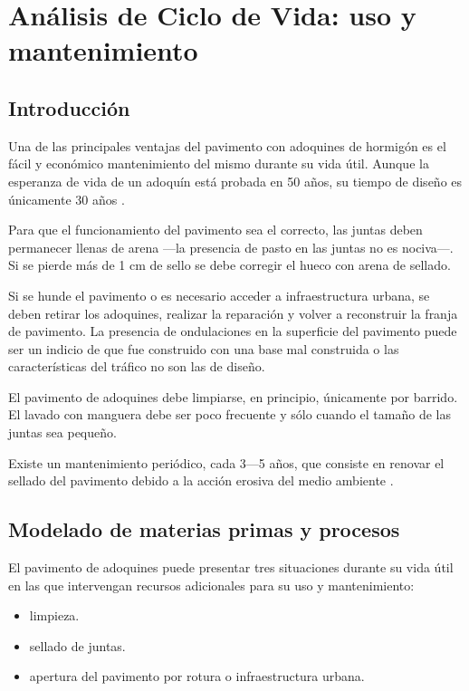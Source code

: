 \chapter{Análisis de Ciclo de Vida: uso y mantenimiento}

\section{Introducción}\label{sec:introduccionuso}

Una de las principales ventajas del pavimento con adoquines de hormigón es el fácil y económico mantenimiento del mismo durante su vida útil. Aunque la esperanza de vida de un adoquín está probada en 50 años, su tiempo de diseño es únicamente 30 años \cite{euroadoquin}.

Para que el funcionamiento del pavimento sea el correcto, las juntas deben permanecer llenas de arena —la presencia de pasto en las juntas no es nociva—. Si se pierde más de 1 \si{cm} de sello se debe corregir el hueco con arena de sellado.

Si se hunde el pavimento o es necesario acceder a infraestructura urbana, se deben retirar los adoquines, realizar la reparación y volver a reconstruir la franja de pavimento. La presencia de ondulaciones en la superficie del pavimento puede ser un indicio de que fue construido con una base mal construida o las características del tráfico no son las de diseño.

El pavimento de adoquines debe limpiarse, en principio, únicamente por barrido. El lavado con manguera debe ser poco frecuente y sólo cuando el tamaño de las juntas sea pequeño.

Existe un mantenimiento periódico, cada 3—5 años, que consiste en renovar el sellado del pavimento debido a la acción erosiva del medio ambiente \cite{malaka}.


\section{Modelado de materias primas y procesos}\label{sec:modeladoprocesosusoymantenimiento}

El pavimento de adoquines puede presentar tres situaciones durante su vida útil en las que intervengan recursos adicionales para su uso y mantenimiento:
\begin{itemize}
\item limpieza.
\item sellado de juntas.
\item apertura del pavimento por rotura o infraestructura urbana.
\end{itemize}

